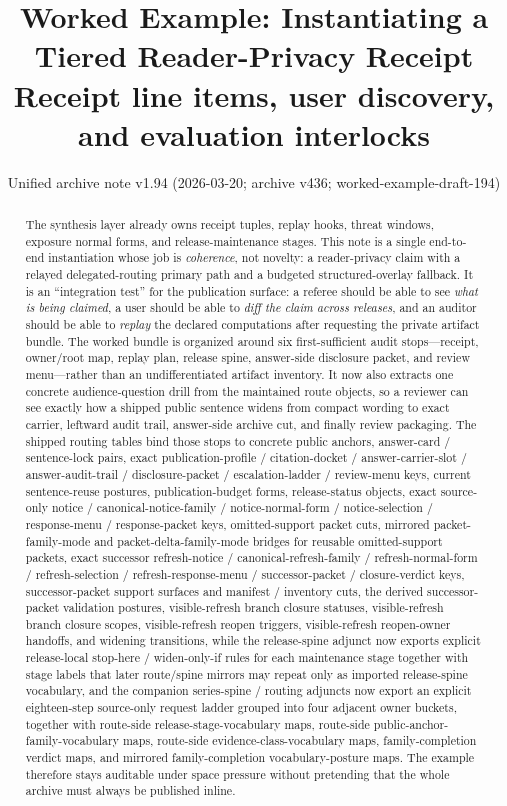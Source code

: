 \documentclass[11pt]{article}
\title{Worked Example: Instantiating a Tiered Reader-Privacy Receipt\\
\large Receipt line items, user discovery, and evaluation interlocks}
\author{}
\date{Unified archive note v1.94 (2026-03-20; archive v436; worked-example-draft-194)}
\begin{document}
\maketitle

\begin{abstract}
The synthesis layer already owns receipt tuples, replay hooks, threat windows, exposure normal forms, and release-maintenance stages.
This note is a single end-to-end instantiation whose job is \emph{coherence}, not novelty:
a reader-privacy claim with a relayed delegated-routing primary path and a budgeted structured-overlay fallback.
It is an ``integration test'' for the publication surface: a referee should be able to see \emph{what is being claimed}, a user should be able to \emph{diff the claim across releases}, and an auditor should be able to \emph{replay} the declared computations after requesting the private artifact bundle.
The worked bundle is organized around six first-sufficient audit stops---receipt, owner/root map, replay plan, release spine, answer-side disclosure packet, and review menu---rather than an undifferentiated artifact inventory. It now also extracts one concrete audience-question drill from the maintained route objects, so a reviewer can see exactly how a shipped public sentence widens from compact wording to exact carrier, leftward audit trail, answer-side archive cut, and finally review packaging.
The shipped routing tables bind those stops to concrete public anchors, answer-card / sentence-lock pairs, exact publication-profile / citation-docket / answer-carrier-slot / answer-audit-trail / disclosure-packet / escalation-ladder / review-menu keys, current sentence-reuse postures, publication-budget forms, release-status objects, exact source-only notice / canonical-notice-family / notice-normal-form / notice-selection / response-menu / response-packet keys, omitted-support packet cuts, mirrored packet-family-mode and packet-delta-family-mode bridges for reusable omitted-support packets, exact successor refresh-notice / canonical-refresh-family / refresh-normal-form / refresh-selection / refresh-response-menu / successor-packet / closure-verdict keys, successor-packet support surfaces and manifest / inventory cuts, the derived successor-packet validation postures, visible-refresh branch closure statuses, visible-refresh branch closure scopes, visible-refresh reopen triggers, visible-refresh reopen-owner handoffs, and widening transitions, while the release-spine adjunct now exports explicit release-local stop-here / widen-only-if rules for each maintenance stage together with stage labels that later route/spine mirrors may repeat only as imported release-spine vocabulary, and the companion series-spine / routing adjuncts now export an explicit eighteen-step source-only request ladder grouped into four adjacent owner buckets, together with route-side release-stage-vocabulary maps, route-side public-anchor-family-vocabulary maps, route-side evidence-class-vocabulary maps, family-completion verdict maps, and mirrored family-completion vocabulary-posture maps. The example therefore stays auditable under space pressure without pretending that the whole archive must always be published inline.
\end{abstract}
\end{document}
